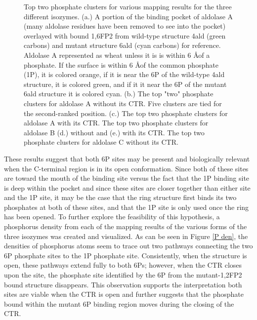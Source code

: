 \documentclass[11pt,a4paper]{article}
\begin{document}
\begin{figure}
\begin{center}
{                        \quad
                }
                \caption{
		Top two phosphate clusters for various mapping results for the three different isozymes.  (a.)
		A portion of the binding pocket of aldolase A (many aldolase residues have been removed to see into the pocket)
		overlayed with bound 1,6FP2 from wild-type structure 4ald (green carbons) and 
		mutant structure 6ald (cyan carbons) for reference.  Aldolase A represented as
		wheat unless it is is within 6 \AA of a phosphate.  If the surface is within 6 \AA of the common phosphate (1P), it is colored orange,
		if it is near the 6P of the wild-type 4ald structure, it is colored green, and if it it near the 6P of the mutant 6ald structure it is colored cyan.
		(b.) The top "two" phosphate clusters for aldolase A without its CTR.  Five clusters are tied for the second-ranked position.
		(c.) The top two phosphate clusters for aldolase A with its CTR. The top two phosphate clusters for aldolase
		B (d.) without and (e.) with its CTR. 	The top two phosphate clusters for aldolase C without its CTR.
                }
                \label{phosphate clusters}
        \end{center}
\end{figure}

	These results suggest that both 6P sites may be present and biologically relevant when the C-terminal region is in its open conformation.
	Since both of these sites are toward the mouth of the binding site versus the fact that the 1P binding site is deep within the pocket and
	since these sites are closer together than either site and the 1P site, it may be the case that the ring structure first binds its two 
	phosphates at both of these sites, and that the 1P site is only used once the ring has been opened.  To further explore the feasibility
	of this hypothesis, a phosphorus density from each of the mapping results of the various forms of the three isozymes was created and
	visualized.  As can be seen in Figure \ref{P den}, the densities of phosphorus atoms seem to trace out two pathways connecting the
	two 6P phosphate sites to the 1P phosphate site.  Consistently, when the structure is open, these pathways extend fully to both 6Ps; however,
	when the CTR closes upon the site, the phosphate site identified by the 6P from the mutant-1,2FP2 bound structure disappears.  This
	observation supports the interpretation both sites are viable when the CTR is open and further suggests that the phosphate bound
	within the mutant 6P binding region moves during the closing of the CTR.   
\end{document}
